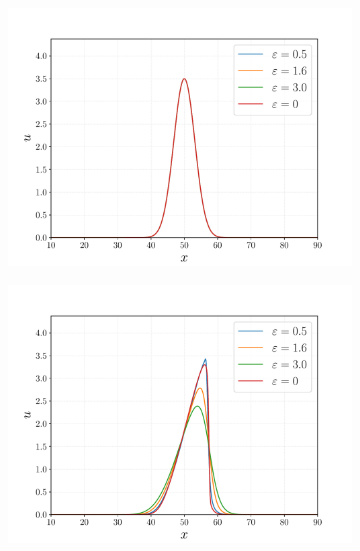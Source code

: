 \begin{figure}[ht]
	\begin{subfigure}{0.5\textwidth}
		\centering
		\includegraphics[width=\linewidth]{../some_plots/burgers-viscosas/graficas/viscosidades-1.pdf}
		\label{fig:viscosas1}
	\end{subfigure}
	\begin{subfigure}{0.5\textwidth}
		\centering
		\includegraphics[width=\linewidth]{../some_plots/burgers-viscosas/graficas/viscosidades-100.pdf}
		\label{fig:viscosas2}
	\end{subfigure}
	\begin{subfigure}{0.5\textwidth}
		\centering

\end{subfigure}
\end{figure}
